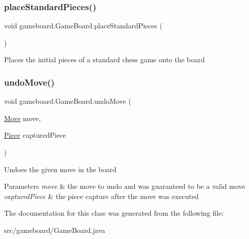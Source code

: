 \subsubsection{\texorpdfstring{place\+Standard\+Pieces()}{placeStandardPieces()}}
{\footnotesize\ttfamily void gameboard.\+Game\+Board.\+place\+Standard\+Pieces (\begin{DoxyParamCaption}{ }\end{DoxyParamCaption})}

Places the initial pieces of a standard chess game onto the board \mbox{\label{classgameboard_1_1_game_board_a82442fc13c1a73e107851235c5cd92a2}} 
\subsubsection{\texorpdfstring{undo\+Move()}{undoMove()}}
{\footnotesize\ttfamily void gameboard.\+Game\+Board.\+undo\+Move (\begin{DoxyParamCaption}\item[{\mbox{\hyperlink{classpieces_1_1_move}{Move}}}]{move,  }\item[{\mbox{\hyperlink{classpieces_1_1_piece}{Piece}}}]{captured\+Piece }\end{DoxyParamCaption})}

Undoes the given move in the board 
\begin{DoxyParams}{Parameters}
{\em move} & the move to undo and was guaranteed to be a valid move \\
\hline
{\em captured\+Piece} & the piece capture after the move was executed \\
\hline
\end{DoxyParams}


The documentation for this class was generated from the following file\+:\begin{DoxyCompactItemize}
\item 
src/gameboard/Game\+Board.\+java\end{DoxyCompactItemize}
